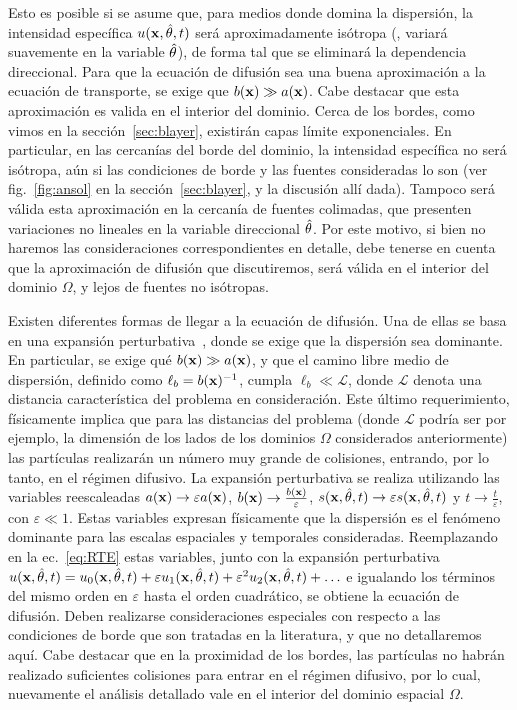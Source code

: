 Esto es posible si se asume que, para medios donde domina la dispersión, 
la intensidad específica $u(\mathbf{x},\hat{\theta},t)$ será aproximadamente 
isótropa (\ie, variará suavemente en la variable $\hat{\theta}$), 
de forma tal que se eliminará la dependencia direccional. Para que la 
ecuación de difusión sea una buena aproximación a la ecuación de 
transporte, se exige que $b(\mathbf{x})\gg a(\mathbf{x})$. Cabe destacar que esta aproximación 
es valida en el interior del dominio. Cerca de los bordes, como vimos en la sección~\ref{sec:blayer}, existirán capas límite exponenciales. 
En particular, en las cercanías del borde del dominio, la intensidad específica no será isótropa, 
aún si las condiciones de borde y las fuentes consideradas lo son (ver fig.~\ref{fig:ansol} 
en la sección~\ref{sec:blayer}, y la discusión allí dada). Tampoco será válida esta 
aproximación en la cercanía de fuentes colimadas, que presenten variaciones no lineales en la variable 
direccional $\hat{\theta}$. Por este motivo, si bien no haremos las consideraciones correspondientes 
en detalle, debe tenerse en cuenta que la aproximación de difusión que discutiremos, 
será válida en el interior del dominio $\Omega$, y lejos de fuentes no isótropas. 

Existen diferentes formas 
de llegar a la ecuación de difusión. Una de ellas se basa en  una expansión perturbativa~\cite{Larsen1974,Larsen1987,Arridge2009}, 
donde se exige que la dispersión sea dominante. En particular, se exige qué $b(\mathbf{x}) \gg a(\mathbf{x})$, 
y que el camino libre medio de dispersión, definido como $\ell_b=b(\mathbf{x})^{-1}$, cumpla $\ell_b\ll \mathcal{L}$, 
donde $\mathcal{L}$ denota una distancia característica del problema en consideración. 
Este último requerimiento, físicamente implica que para las distancias del problema (donde $\mathcal{L}$ 
podría ser por ejemplo, la dimensión de los lados de los dominios $\Omega$ considerados anteriormente) las partículas realizarán un número muy grande de colisiones, entrando, por lo tanto, en el régimen difusivo. La expansión perturbativa se realiza utilizando las variables 
reescaleadas $a(\mathbf{x}) \rightarrow \varepsilon a(\mathbf{x})$, $b(\mathbf{x}) \rightarrow \frac{b(\mathbf{x})}{\varepsilon}$, $s(\mathbf{x},\hat{\theta},t)\rightarrow  \varepsilon s(\mathbf{x},\hat{\theta},t)$ y $t\rightarrow \frac{t}{\varepsilon}$, con $\varepsilon \ll 1$. Estas variables  expresan físicamente que la dispersión es el fenómeno dominante para las 
escalas espaciales y temporales consideradas. Reemplazando en la ec.~\eqref{eq:RTE} estas variables, junto con la expansión perturbativa $u(\mathbf{x},\hat{\theta},t)=u_0(\mathbf{x},\hat{\theta},t)+\varepsilon u_1(\mathbf{x},\hat{\theta},t)+\varepsilon^2 u_2(\mathbf{x},\hat{\theta},t)+\ldots$ e igualando los términos del mismo orden en $\varepsilon$ 
hasta el orden cuadrático, se obtiene la ecuación de difusión. Deben realizarse consideraciones especiales con respecto a las condiciones de 
borde que son tratadas en la literatura, y que no detallaremos aquí. Cabe destacar que en la proximidad de los bordes, las partículas no habrán realizado suficientes colisiones para entrar en el régimen difusivo, por lo cual, nuevamente el análisis detallado vale en el interior del dominio espacial $\Omega$. 

